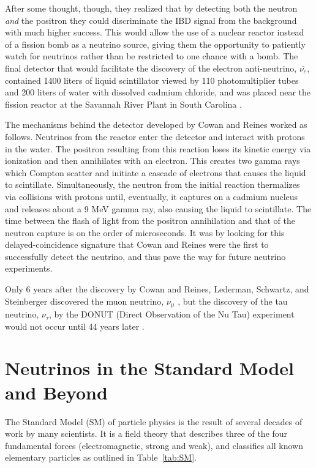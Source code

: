 After some thought, though, they realized that by detecting both the neutron \textit{and} the positron they could discriminate the IBD signal from the background with much higher success. 
This would allow the use of a nuclear reactor instead of a fission bomb as a neutrino source, giving them the opportunity to patiently watch for neutrinos rather than be restricted to one chance with a bomb. 
The final detector that would facilitate the discovery of the electron anti-neutrino, $\bar{\nu_{e}}$, contained 1400 liters of liquid scintillator viewed by 110 photomultiplier tubes and 200 liters of water with dissolved cadmium chloride, and was placed near the fission reactor at the Savannah River Plant in South Carolina \cite{Cowan}. 

The mechanisms behind the detector developed by Cowan and Reines worked as follows. 
Neutrinos from the reactor enter the detector and interact with protons in the water. 
The positron resulting from this reaction loses its kinetic energy via ionization and then annihilates with an electron. 
This creates two gamma rays which Compton scatter and initiate a cascade of electrons that causes the liquid to scintillate. 
Simultaneously, the neutron from the initial reaction thermalizes via collisions with protons until, eventually, it captures on a cadmium nucleus and releases about a 9 MeV gamma ray, also causing the liquid to scintillate. 
The time between the flash of light from the positron annihilation and that of the neutron capture is on the order of microseconds. 
It was by looking for this delayed-coincidence signature that Cowan and Reines were the first to successfully detect the neutrino, and thus pave the way for future neutrino experiments. 

Only 6 years after the discovery by Cowan and Reines, Lederman, Schwartz, and Steinberger discovered the muon neutrino, $\nu_{\mu}$ \cite{Lederman},
but the discovery of the tau neutrino, $\nu_{\tau}$, by the DONUT (Direct Observation of the Nu Tau) experiment would not occur until 44 years later \cite{TauDONUT,DONUT}.


\section{Neutrinos in the Standard Model and Beyond} \label{ch:NeutrinosInSM}

The Standard Model (SM) of particle physics is the result of several decades of work by many scientists. It is a field theory that describes three of the four fundamental forces (electromagnetic, strong and weak), and classifies all known elementary particles as outlined in Table~\ref{tab:SM}.

